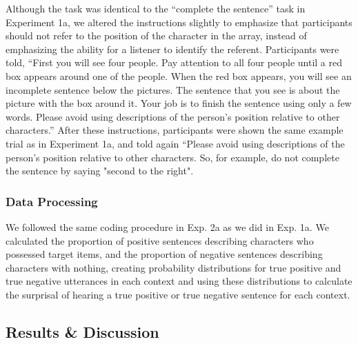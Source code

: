\documentclass[man, floatsintext, noapacite]{apa6}
\begin{document}
Although the task was identical to the ``complete the sentence'' task in Experiment 1a, we altered the instructions slightly to emphasize that participants should not refer to the position of the character in the array, instead of emphasizing the ability for a listener to identify the referent. Participants were told, ``First you will see four people. Pay attention to all four people until a red box appears around one of the people. When the red box appears, you will see an incomplete sentence below the pictures. The sentence that you see is about the picture with the box around it. Your job is to finish the sentence using only a few words. Please avoid using descriptions of the person's position relative to other characters.'' After these instructions, participants were shown the same example trial as in Experiment 1a, and told again ``Please avoid using descriptions of the person's position relative to other characters. So, for example, do not complete the sentence by saying "second to the right".

\subsubsection{Data Processing} 

We followed the same coding procedure in Exp. 2a as we did in Exp. 1a. We calculated the proportion of positive sentences describing characters who possessed target items, and the proportion of negative sentences describing characters with nothing, creating probability distributions for true positive and true negative utterances in each context and using these distributions to calculate the surprisal of hearing a true positive or true negative sentence for each context. 


\subsection{Results \& Discussion}
\end{document}
